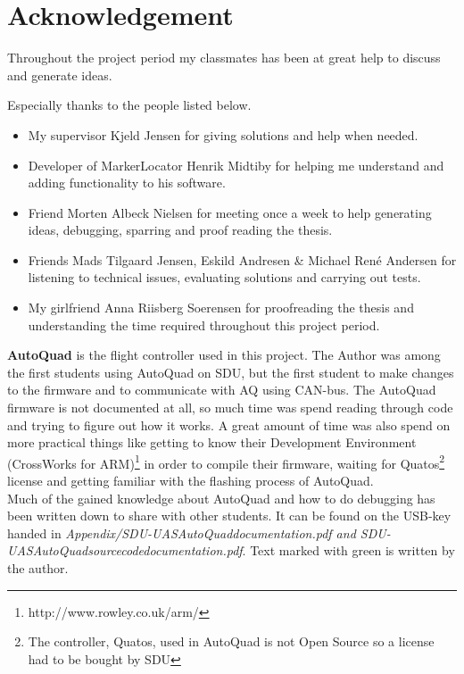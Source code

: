 \section*{Acknowledgement}
Throughout the project period my classmates has been at great help to discuss and generate ideas.

Especially thanks to the people listed below.
\begin{itemize}
	\item My supervisor Kjeld Jensen for giving solutions and help when needed.
	\item Developer of MarkerLocator Henrik Midtiby for helping me understand and adding functionality to his software.
	\item Friend Morten Albeck Nielsen for meeting once a week to help generating ideas, debugging, sparring and proof reading the thesis.
	\item Friends Mads Tilgaard Jensen, Eskild Andresen \& Michael René Andersen for listening to technical issues, evaluating solutions and carrying out tests.
	\item My girlfriend Anna Riisberg Soerensen for proofreading the thesis and understanding the time required throughout this project period.
\end{itemize}


\textbf{AutoQuad} is the flight controller used in this project. The Author was among the first students using AutoQuad on SDU, but the first student to make changes to the firmware and to communicate with AQ using CAN-bus. The AutoQuad firmware is not documented at all, so much time was spend reading through code and trying to figure out how it works. A great amount of time was also spend on more practical things like getting to know their Development Environment (CrossWorks for ARM)\footnote{http://www.rowley.co.uk/arm/} in order to compile their firmware, waiting for Quatos\footnote{The controller, Quatos,  used in AutoQuad is not Open Source so a license had to be bought by SDU} license and getting familiar with the flashing process of AutoQuad.\\
Much of the gained knowledge about AutoQuad and how to do debugging has been written down to share with other students. It can be found on the USB-key handed in \textit{Appendix/SDU-UASAutoQuaddocumentation.pdf and SDU-UASAutoQuadsourcecodedocumentation.pdf}. Text marked with green is written by the author.